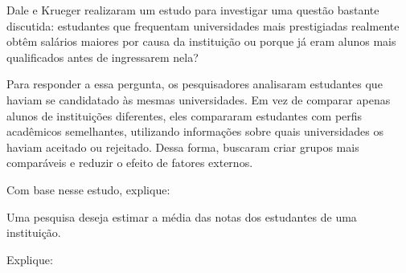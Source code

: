 \documentclass[a4paper, 12pt, addpoints]{exam}
\begin{document}
\begin{questions}
	Dale e Krueger realizaram um estudo para investigar uma questão bastante discutida: estudantes que frequentam universidades mais prestigiadas realmente obtêm salários maiores por causa da instituição ou porque já eram alunos mais qualificados antes de ingressarem nela?
	
	Para responder a essa pergunta, os pesquisadores analisaram estudantes que haviam se candidatado às mesmas universidades. Em vez de comparar apenas alunos de instituições diferentes, eles compararam estudantes com perfis acadêmicos semelhantes, utilizando informações sobre quais universidades os haviam aceitado ou rejeitado. Dessa forma, buscaram criar grupos mais comparáveis e reduzir o efeito de fatores externos.
	
	Com base nesse estudo, explique:
	
	
	\question[1]
	
	Uma pesquisa deseja estimar a média das notas dos estudantes de uma instituição.
	
	Explique:
	
\end{questions}
\end{document}
